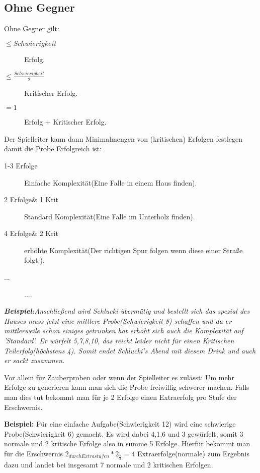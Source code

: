 \subsection{Ohne Gegner}
\label{ohneGegner}
Ohne Gegner gilt:
\begin{description}
\item[$\leq Schwierigkeit$] Erfolg.
\item[$\leq \frac{Schwierigkeit}{2}$] Kritischer Erfolg.
\item[$=1$] Erfolg + Kritischer Erfolg.
\end{description}

Der Spielleiter kann dann Minimalmengen von (kritischen) Erfolgen festlegen damit die Probe Erfolgreich ist:
\begin{description}
\item[1-3 Erfolge] Einfache Komplexität(Eine Falle in einem Haus finden).
\item[2 Erfolge\& 1 Krit] Standard Komplexität(Eine Falle im Unterholz finden).
\item[4 Erfolge\& 2 Krit] erhöhte Komplexität(Der richtigen Spur folgen wenn diese einer Straße folgt.).
\item[...] ....
\end{description}

\textit{\textbf{Beispiel:}Anschließend wird Schlucki übermütig und bestellt sich das spezial des Hauses muss jetzt eine mittlere Probe(Schwierigkeit 8) schaffen und da er mittlerweile schon einiges getrunken hat erhöht sich auch die Komplexität auf 'Standard'. Er würfelt 5,7,8,10, das reicht leider nicht für einen Kritischen Teilerfolg(höchstens 4). Somit endet Schlucki's Abend mit diesem Drink und auch er sackt zusammen.}

Vor allem für Zauberproben oder wenn der Spielleiter es zulässt:
Um mehr Erfolge zu generieren kann man sich die Probe freiwillig schwerer machen. Falls man dies tut bekommt man für je 2 Erfolge einen Extraerfolg pro Stufe der Erschwernis.

\textbf{Beispiel:} Für eine einfache Aufgabe(Schwierigkeit 12) wird eine schwierige Probe(Schwierigkeit 6) gemacht. Es wird dabei 4,1,6 und 3 gewürfelt, somit 3 normale und 2 kritische Erfolge also in summe 5 Erfolge. Hierfür bekommt man für die Erschwernis $2_{durch Extrastufen}*2_{\frac{5}{2}}=4$ Extraerfolge(normale) zum Ergebnis dazu und landet bei insgesamt 7 normale und 2 kritischen Erfolgen.

